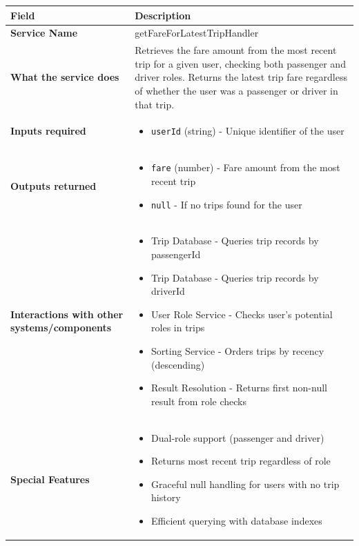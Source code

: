 \documentclass[11pt,a4paper]{article}
\begin{document}
\begin{longtable}{|p{3cm}|p{12cm}|}
\hline
\textbf{Field} & \textbf{Description} \\
\hline
\textbf{Service Name} & getFareForLatestTripHandler \\
\hline
\textbf{What the service does} & 
Retrieves the fare amount from the most recent trip for a given user, checking both passenger and driver roles. Returns the latest trip fare regardless of whether the user was a passenger or driver in that trip. \\
\hline
\textbf{Inputs required} & 
\begin{itemize}[nosep]
\item \texttt{userId} (string) - Unique identifier of the user
\end{itemize} \\
\hline
\textbf{Outputs returned} & 
\begin{itemize}[nosep]
\item \texttt{fare} (number) - Fare amount from the most recent trip
\item \texttt{null} - If no trips found for the user
\end{itemize} \\
\hline
\textbf{Interactions with other systems/components} & 
\begin{itemize}[nosep]
\item Trip Database - Queries trip records by passengerId
\item Trip Database - Queries trip records by driverId
\item User Role Service - Checks user's potential roles in trips
\item Sorting Service - Orders trips by recency (descending)
\item Result Resolution - Returns first non-null result from role checks
\end{itemize} \\
\hline
\textbf{Special Features} & 
\begin{itemize}[nosep]
\item Dual-role support (passenger and driver)
\item Returns most recent trip regardless of role
\item Graceful null handling for users with no trip history
\item Efficient querying with database indexes
\end{itemize} \\
\hline
\end{longtable}
\end{document}
